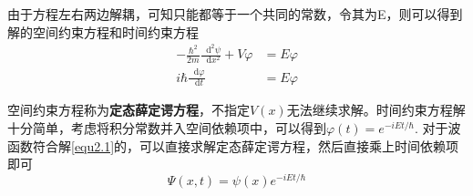 \documentclass[UTF8]{ctexart}
\newcommand*{\dif}{\mathop{}\!\mathrm{d}}
\begin{document}
\noindent 由于方程左右两边解耦，可知只能都等于一个共同的常数，令其为E，则可以得到解的空间约束方程和时间约束方程
    \begin{equation}
        \begin{aligned}
            - \frac{\hbar^2}{2m}\frac{\dif^2 \psi}{\dif x^2} + V \varphi &= E \varphi \\
            i \hbar \frac{\dif \varphi}{\dif t} &= E \varphi
        \end{aligned}
    \end{equation}
    
\noindent 空间约束方程称为\textbf{定态薛定谔方程}，不指定$V(x)$无法继续求解。时间约束方程解十分简单，考虑将积分常数并入空间依赖项中，可以得到$\varphi(t) = e^{-iEt/\hbar}$. 对于波函数符合解\autoref{equ2.1}的，可以直接求解定态薛定谔方程，然后直接乘上时间依赖项即可
    \begin{equation}
        \Psi(x,t) = \psi(x) e ^{-i E t/\hbar}
    \end{equation}
\end{document}
